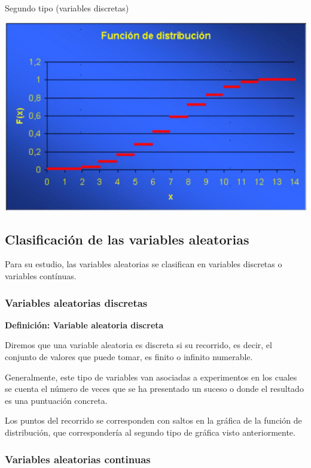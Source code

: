 \documentclass[
]{article}
\begin{document}
Segundo tipo (variables discretas)

\includegraphics[width=0.9\linewidth]{images/cdfDiscreta}

\subsection{Clasificación de las variables aleatorias}\label{clasificaciuxf3n-de-las-variables-aleatorias}

Para su estudio, las variables aleatorias se clasifican en variables
discretas o variables contínuas.

\subsubsection{Variables aleatorias discretas}\label{variables-aleatorias-discretas}

\textbf{Definición: Variable aleatoria discreta}

Diremos que una variable aleatoria es discreta si su recorrido, es decir, el conjunto de valores que puede tomar, es finito
o infinito numerable.

Generalmente, este tipo de variables van asociadas
a experimentos en los cuales se cuenta el número de veces que se ha
presentado un suceso o donde el resultado es una puntuación concreta.

Los puntos del recorrido se corresponden con saltos en la gráfica de la
función de distribución, que correspondería al segundo tipo de gráfica
visto anteriormente.

\subsubsection{Variables aleatorias continuas}\label{variables-aleatorias-continuas}
\end{document}
